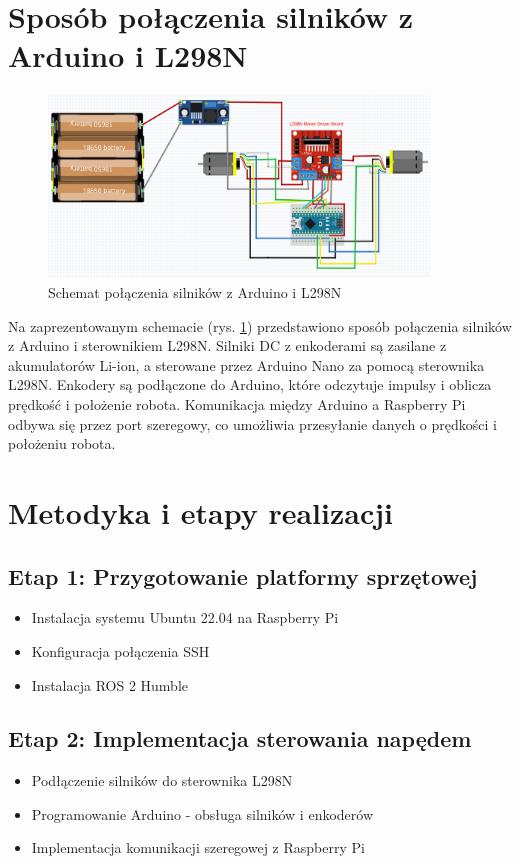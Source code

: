 \documentclass[a4paper,twoside,12pt]{book}
\begin{document}
\section{Sposób połączenia silników z Arduino i L298N}
\begin{figure}[h]
	\centering
	\includegraphics[width=0.9\textwidth]{images/schema_arduino.png}
	\caption{Schemat połączenia silników z Arduino i L298N}
	\label{fig:arduino-schema}
	\end{figure}
Na zaprezentowanym schemacie (rys. \ref{fig:arduino-schema}) przedstawiono sposób połączenia silników z Arduino i sterownikiem L298N. Silniki DC z enkoderami są zasilane z akumulatorów Li-ion, a sterowane przez Arduino Nano za pomocą sterownika L298N. Enkodery są podłączone do Arduino, które odczytuje impulsy i oblicza prędkość i położenie robota. Komunikacja między Arduino a Raspberry Pi odbywa się przez port szeregowy, co umożliwia przesyłanie danych o prędkości i położeniu robota.
\newpage

\section{Metodyka i etapy realizacji}
\subsection{Etap 1: Przygotowanie platformy sprzętowej}
\begin{itemize}
\item Instalacja systemu Ubuntu 22.04 na Raspberry Pi
\item Konfiguracja połączenia SSH
\item Instalacja ROS 2 Humble
\end{itemize}

\subsection{Etap 2: Implementacja sterowania napędem}
\begin{itemize}
\item Podłączenie silników do sterownika L298N
\item Programowanie Arduino - obsługa silników i enkoderów
\item Implementacja komunikacji szeregowej z Raspberry Pi
\end{itemize}
\end{document}
